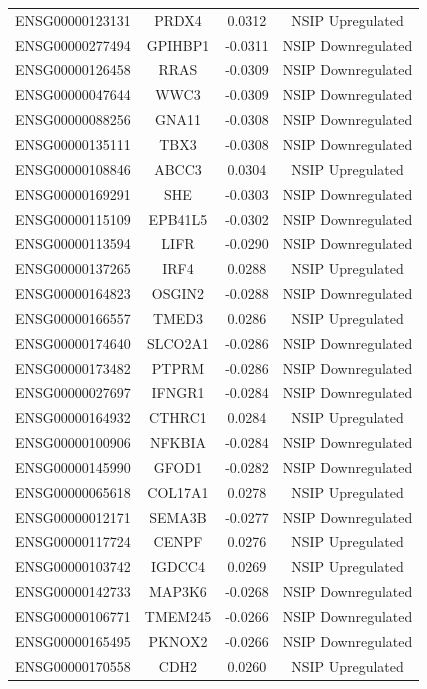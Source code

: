\documentclass[
]{article}
\begin{document}
\begin{singlespace}
\begin{longtable}[t]{lccc}
ENSG00000123131 & PRDX4 & 0.0312 & NSIP Upregulated\\
ENSG00000277494 & GPIHBP1 & -0.0311 & NSIP Downregulated\\
\addlinespace
ENSG00000126458 & RRAS & -0.0309 & NSIP Downregulated\\
ENSG00000047644 & WWC3 & -0.0309 & NSIP Downregulated\\
ENSG00000088256 & GNA11 & -0.0308 & NSIP Downregulated\\
ENSG00000135111 & TBX3 & -0.0308 & NSIP Downregulated\\
ENSG00000108846 & ABCC3 & 0.0304 & NSIP Upregulated\\
\addlinespace
ENSG00000169291 & SHE & -0.0303 & NSIP Downregulated\\
ENSG00000115109 & EPB41L5 & -0.0302 & NSIP Downregulated\\
ENSG00000113594 & LIFR & -0.0290 & NSIP Downregulated\\
ENSG00000137265 & IRF4 & 0.0288 & NSIP Upregulated\\
ENSG00000164823 & OSGIN2 & -0.0288 & NSIP Downregulated\\
\addlinespace
ENSG00000166557 & TMED3 & 0.0286 & NSIP Upregulated\\
ENSG00000174640 & SLCO2A1 & -0.0286 & NSIP Downregulated\\
ENSG00000173482 & PTPRM & -0.0286 & NSIP Downregulated\\
ENSG00000027697 & IFNGR1 & -0.0284 & NSIP Downregulated\\
ENSG00000164932 & CTHRC1 & 0.0284 & NSIP Upregulated\\
\addlinespace
ENSG00000100906 & NFKBIA & -0.0284 & NSIP Downregulated\\
ENSG00000145990 & GFOD1 & -0.0282 & NSIP Downregulated\\
ENSG00000065618 & COL17A1 & 0.0278 & NSIP Upregulated\\
ENSG00000012171 & SEMA3B & -0.0277 & NSIP Downregulated\\
ENSG00000117724 & CENPF & 0.0276 & NSIP Upregulated\\
\addlinespace
ENSG00000103742 & IGDCC4 & 0.0269 & NSIP Upregulated\\
ENSG00000142733 & MAP3K6 & -0.0268 & NSIP Downregulated\\
ENSG00000106771 & TMEM245 & -0.0266 & NSIP Downregulated\\
ENSG00000165495 & PKNOX2 & -0.0266 & NSIP Downregulated\\
ENSG00000170558 & CDH2 & 0.0260 & NSIP Upregulated\\

\end{longtable}
\end{singlespace}
\end{document}
